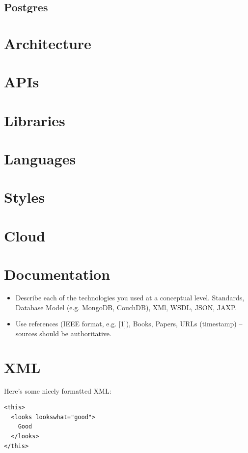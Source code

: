 \subsection{Postgres}

\section{Architecture}

\section{APIs}

\section{Libraries}

\section{Languages}

\section{Styles}

\section{Cloud}

\section{Documentation}
\begin{itemize}
\item Describe each of the technologies you used at a conceptual level. Standards, Database Model (e.g. MongoDB, CouchDB), XMl, WSDL, JSON, JAXP.
\item Use references (IEEE format, e.g. [1]), Books, Papers, URLs (timestamp) – sources should be authoritative. 
\end{itemize}

\section{XML}
Here's some nicely formatted XML:
\begin{verbatim}
<this>
  <looks lookswhat="good">
    Good
  </looks>
</this>
\end{verbatim}

